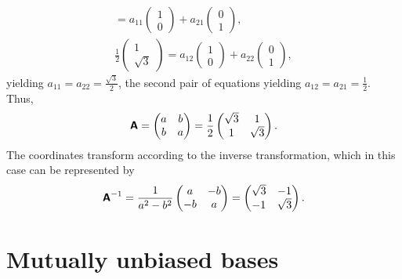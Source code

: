 {\begin{enumerate}
\begin{equation}
\begin{split}
=
a_{11}
\begin{pmatrix}
1\\0
\end{pmatrix}
+
a_{21}
\begin{pmatrix}
0\\1
\end{pmatrix} ,
\\
\frac{1}{{2}}
\begin{pmatrix}
1\\\sqrt{3}
\end{pmatrix}
=
a_{12}
\begin{pmatrix}
1\\0
\end{pmatrix}
+
a_{22}
\begin{pmatrix}
0\\1
\end{pmatrix}
,
\end{split}
\end{equation}
yielding
$a_{11}=a_{22}=\frac{\sqrt{3}}{2}$,
the second pair of equations yielding
$a_{12}= a_{21}=\frac{1}{{2}}$.
Thus,
\begin{equation}
 \textsf{\textbf{A}}=
\begin{pmatrix}
a&b\\
b&a
\end{pmatrix}
=
\frac{1}{{2}}
\begin{pmatrix}
\sqrt{3}&1\\
1&\sqrt{3}
\end{pmatrix}
.
\end{equation}
The coordinates transform according to the inverse transformation, which in this case can be represented by
\begin{equation}
 \textsf{\textbf{A}}^{-1}=
\frac{1}{{a^2-b^2}}
\begin{pmatrix}
a &-b\\
-b&a
\end{pmatrix}
=
\begin{pmatrix}
\sqrt{3}&-1\\
-1&\sqrt{3}
\end{pmatrix}
.
\end{equation}

\end{enumerate}


\eexample
}


\section{Mutually unbiased bases}

